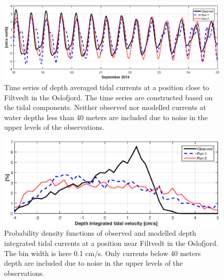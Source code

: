 \begin{figure}[!t]
\centering
\includegraphics[width=\textwidth]{fig_Filtvedt_timeseries}
\caption{Time series of depth averaged tidal currents at a position close to Filtvedt in the Oslofjord. The time series are constructed based on the tidal components. Neither observed nor modelled currents at water depths less than 40 meters are included due to noise in the upper levels of the observations.}
\label{fig:Filtvedt_timeseries}
\end{figure}

\begin{figure}[!t]
\centering
\includegraphics[width=\textwidth]{fig_Filtvedt_pdf}
\caption{Probability density functions of observed and modelled depth integrated tidal currents at a position near Filtvedt in the Oslofjord. The bin width is here 0.1 cm/s. Only currents below 40 meters depth are included due to noise in the upper levels of the observations.}
\label{fig:Filtvedt_pdf}
\end{figure}


